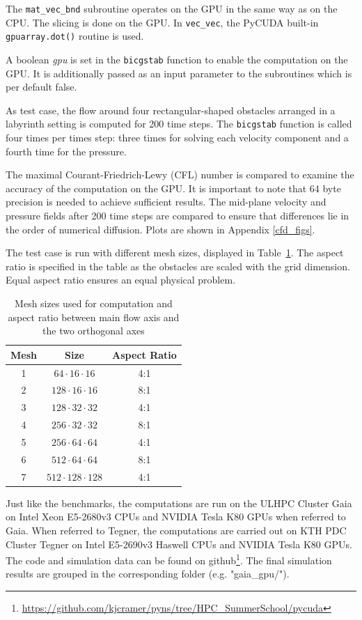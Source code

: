 \documentclass[11pt]{article}
\begin{document}
The \texttt{mat\_vec\_bnd} subroutine operates on the GPU in the same way as on the CPU. The slicing is done on the GPU. In \texttt{vec\_vec}, the PyCUDA built-in \texttt{gpuarray.dot()} routine is used.

A boolean \emph{gpu} is set in the \texttt{bicgstab} function to enable the computation on the GPU. It is additionally passed as an input parameter to the subroutines which is per default false. 

As test case, the flow around four rectangular-shaped obstacles arranged in a labyrinth setting is computed for 200 time steps. The \texttt{bicgstab} function is called four times per times step: three times for solving each velocity component and a fourth time for the pressure. 

The maximal Courant-Friedrich-Lewy (CFL) number is compared to examine the accuracy of the computation on the GPU. It is important to note that 64 byte precision is needed to achieve sufficient results. The mid-plane velocity and pressure fields after 200 time steps are compared to ensure that differences lie in the order of numerical diffusion. Plots are shown in Appendix \ref{cfd_figs}.

The test case is run with different mesh sizes, displayed in Table~\ref{mesh_sizes}. The aspect ratio is specified in the table as the obstacles are scaled with the grid dimension. Equal aspect ratio ensures an equal physical problem.

\begin{table}[h]
    \centering
    \begin{tabular}{c|c|c}
     Mesh & Size & Aspect Ratio \\
     \hline
     1 & $ 64 \cdot  16 \cdot  16$ & 4:1  \\
     2 & $128 \cdot  16 \cdot  16$ & 8:1  \\
     3 & $128 \cdot  32 \cdot  32$ & 4:1  \\
     4 & $256 \cdot  32 \cdot  32$ & 8:1  \\
     5 & $256 \cdot  64 \cdot  64$ & 4:1  \\
     6 & $512 \cdot  64 \cdot  64$ & 8:1  \\
     7 & $512 \cdot 128 \cdot 128$ & 4:1
    \end{tabular}
    \caption{Mesh sizes used for computation and aspect ratio between main flow axis and the two orthogonal axes}
    \label{mesh_sizes}
\end{table}

Just like the benchmarks, the computations are run on the ULHPC Cluster Gaia on Intel Xeon E5-2680v3 CPUs and NVIDIA Tesla K80 GPUs when referred to Gaia. When referred to Tegner, the computations are carried out on KTH PDC Cluster Tegner on Intel E5-2690v3 Haswell CPUs and NVIDIA Tesla K80 GPUs. The code and simulation data can be found on github\footnote{\url{https://github.com/kjcramer/pyns/tree/HPC_SummerSchool/pycuda}}. The final simulation results are grouped in the corresponding folder (e.g. "gaia\_gpu/").
\end{document}
